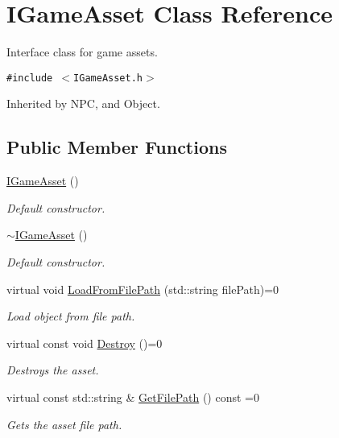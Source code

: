 \hypertarget{class_i_game_asset}{
\section{IGameAsset Class Reference}
\label{class_i_game_asset}
}
Interface class for game assets.  


{\tt \#include $<$IGameAsset.h$>$}

Inherited by NPC, and Object.

\subsection*{Public Member Functions}
\begin{CompactItemize}
\item 
\hyperlink{class_i_game_asset_53edef712a3f422c5390e135c0d0a90d}{IGameAsset} ()
\begin{CompactList}\small\item\em Default constructor. \item\end{CompactList}\item 
\hyperlink{class_i_game_asset_59d0aefea418a3df2b73abdfbc911366}{$\sim$IGameAsset} ()
\begin{CompactList}\small\item\em Default constructor. \item\end{CompactList}\item 
virtual void \hyperlink{class_i_game_asset_56b8cc22f2d683cc1b36fe6f76945886}{LoadFromFilePath} (std::string filePath)=0
\begin{CompactList}\small\item\em Load object from file path. \item\end{CompactList}\item 
virtual const void \hyperlink{class_i_game_asset_959fc9a958e94213c44dbfe0119c76be}{Destroy} ()=0
\begin{CompactList}\small\item\em Destroys the asset. \item\end{CompactList}\item 
virtual const std::string \& \hyperlink{class_i_game_asset_a7eba4ae57e5e30eac800af114c84d37}{GetFilePath} () const =0
\begin{CompactList}\small\item\em Gets the asset file path. \item\end{CompactList}\item 

\end{CompactItemize}
